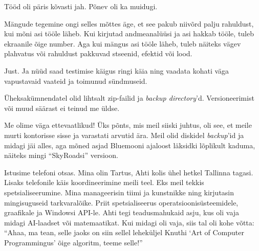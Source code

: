 
Tööd oli päris kõvasti jah. Põnev oli ka muidugi.


Mängude tegemine ongi selles mõttes äge, et see pakub niivõrd palju rahuldust, kui mõni asi tööle läheb. Kui kirjutad andmeanalüüsi ja asi hakkab
tööle, tuleb ekraanile õige number. Aga kui mängus asi tööle läheb, tuleb 
näiteks vägev plahvatus või rahuldust pakkuvad 
stseenid, efektid või lood. 


Just. Ja nüüd saad testimise käigus ringi käia ning vaadata
kohati väga vapustavaid vaateid ja toimunud sündmuseid.


Üheksakümnendatel olid lihtsalt zip-failid ja \emph{backup directory}'d. 
Versioneerimist või muud säärast ei teinud me üldse. 


Me olime väga ettevaatlikud! Üks põnts, mis meil siiski juhtus, oli see, et meile murti 
kontorisse sisse ja varastati arvutid ära. Meil olid diskidel \emph{backup}'id ja 
midagi jäi alles, aga mõned asjad Bluemooni ajaloost läksidki lõplikult 
kaduma, näiteks mingi \enquote{SkyRoadsi} versioon.


Istusime telefoni otsas. Mina olin Tartus, Ahti kolis ühel 
hetkel Tallinna tagasi. Lisaks telefonile käis koordineerimine meili 
teel. Eks meil tekkis spetsialiseerumine. Mina manageerisin tiimi ja 
kunstnikke ning kirjutasin mingisuguseid tarkvaralõike. Priit spetsialiseerus operatsioonisüsteemidele, graafikale ja Windowsi API-le. Ahti tegi 
teadusmahukaid asju, kus oli vaja midagi AI-laadset või 
matemaatikat. Kui midagi oli vaja, siis tal oli kohe võtta: \enquote{Ahaa, ma tean, selle jaoks 
on siin sellel leheküljel Knuthi \enquote{Art of Computer Programmingus} õige algoritm, teeme selle!}

